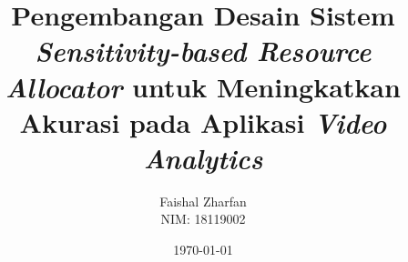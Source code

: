 \documentclass[12pt, a4paper, onecolumn, oneside, final]{report}
\begin{document}
    \title{Pengembangan Desain Sistem \emph{Sensitivity-based Resource Allocator} 
    untuk Meningkatkan Akurasi pada Aplikasi
    \emph{Video Analytics}}
    \date{\today}
    \author{
        Faishal Zharfan \\
        NIM: 18119002
    }

    \setcounter{page}{0}

    
    
	
    
    
    
    

    \pagestyle{plain}

    

    \renewcommand*\contentsname{DAFTAR ISI}
    \renewcommand*\appendixtocname{DAFTAR LAMPIRAN}
    \renewcommand*\listfigurename{DAFTAR GAMBAR DAN ILUSTRASI}
    \renewcommand*\listtablename{DAFTAR TABEL}
    \renewcommand*\bibname{DAFTAR PUSTAKA}

    \tableofcontents
    \listofappendices
    {%
		\let\oldnumberline\numberline%
		\renewcommand{\numberline}{\figurename~\oldnumberline}%
		\listoffigures%
	}
	{%
		\let\oldnumberline\numberline%
		\renewcommand{\numberline}{\tablename~\oldnumberline}%
		\listoftables%
	}
	
    
    \renewcommand{\chaptername}{BAB}
\end{document}

